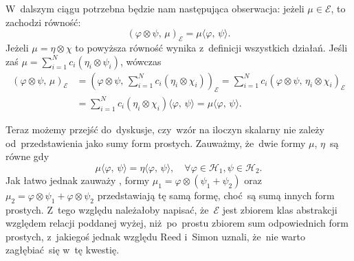 \documentclass[a4paper,11pt]{article}
\newcommand{\mc}{\mathcal}
\newcommand{\vp}{\varphi}
\newcommand{\Hc}{\mc{H}}
\newcommand{\ot}{\otimes}
\newcommand{\Sum}{\sum\limits}
\newcommand{\lket}{\langle}
\newcommand{\rket}{\rangle}
\newcommand{\SP}[2]{( #1, \, #2 )} %
\newcommand{\dket}[2]{\lket #1, \, #2 \rket} %
\begin{document}
W~dalszym ciągu potrzebna będzie nam następująca obserwacja: jeżeli
$\mu \in \mc{E}$, to zachodzi równość:
\begin{equation*}
  \SP{ \vp \ot \psi }{ \mu }_{ \mc{E} } = \mu\dket{ \vp }{ \psi }.
\end{equation*}
Jeżeli $\mu = \eta \ot \chi$ to powyższa równość wynika z~definicji
wszystkich działań. Jeśli zaś
$\mu = \Sum_{ i = 1 }^{ N } c_{ i } ( \eta_{ i } \ot \psi_{ i } )$,
wówczas
\begin{equation*}
  \begin{split}
    \SP{ \vp \ot \psi }{ \mu }_{ \mc{E} } &= \left( \vp \ot \psi, \,
      \Sum_{ i = 1 }^{ N } c_{ i } ( \eta_{ i } \ot \chi_{ i } )
    \right)_{ \mc{E} } = \Sum_{ i = 1 }^{ N } c_{ i } \SP{ \vp \ot
      \psi }
    { \eta_{ i } \ot \chi_{ i } }_{ \mc{E} } \\
    &= \Sum_{ i = 1 }^{ N } c_{ i } ( \eta_{ i } \ot \chi_{ i } )
    \dket{ \vp }{ \psi } = \mu\dket{ \vp }{ \psi }.
  \end{split}
\end{equation*}

Teraz możemy przejść do~dyskusje, %
czy~wzór na iloczyn skalarny nie zależy od~przedstawienia jako sumy
form prostych. Zauważmy, że~dwie formy $\mu$, $\eta$~są równe gdy
\begin{equation*}
  \mu\dket{ \vp }{ \psi } = \eta\dket{ \vp }{ \psi },
  \quad \forall \vp \in \Hc_{ 1 }, \psi \in \Hc_{ 2 }.
\end{equation*}
Jak łatwo jednak zauważy %
, formy $\mu_{ 1 } = \vp \ot ( \psi_{ 1 } + \psi_{ 2 } )$
oraz~$\mu_{ 2 } = \vp \ot \psi_{ 1 } + \vp \ot \psi_{ 2 }$
przedstawiają tę samą formę, choć~są sumą innych form prostych. Z~tego
względu należałoby napisać, że~$\mc{E}$ jest zbiorem klas abstrakcji
względem relacji poddanej wyżej, niż~po~prostu zbiorem sum
odpowiednich form prostych, z~jakiegoś jednak względu Reed i~Simon
uznali, że~nie warto zagłębiać~się w~tę kwestię.
\end{document}
